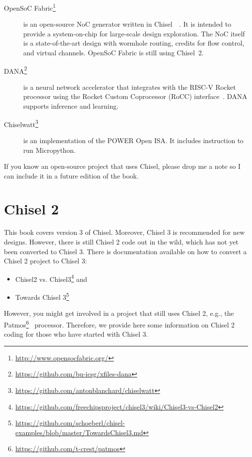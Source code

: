 \documentclass[%
    10pt,
    headinclude, footexclude,
    openright, %
    notitlepage,
    cleardoubleempty,
    headsepline,
    pointlessnumbers,
    bibtotoc, idxtotoc,
    ]{scrbook}
\newcommand{\myref}[2]{\href{#1}{#2}}
\renewcommand{\myref}[2]{{#2}{\footnote{\url{#1}}}}
\begin{document}
\begin{description}
\item[\myref{http://www.opensocfabric.org/}{OpenSoC Fabric}] is an open-source NoC
generator written in Chisel~~\cite{OpenSoC:ispass2016}. It is intended to provide a
system-on-chip for large-scale design exploration. The NoC itself is a state-of-the-art design with wormhole routing, credits for flow control, and virtual channels.
OpenSoC Fabric is still using Chisel~2.

\item[\myref{https://github.com/bu-icsg/xfiles-dana}{DANA}] is a neural network accelerator
that integrates with the RISC-V Rocket processor using the Rocket Custom Coprocessor (RoCC) interface~\cite{RoCC:2015}.
DANA supports inference and learning.

\item[\myref{https://github.com/antonblanchard/chiselwatt}{Chiselwatt}] is an implementation
of the POWER Open ISA. It includes instruction to run Micropython.

\end{description}

If you know an open-source project that uses Chisel, please drop me a note
so I can include it in a future edition of the book.

\chapter{Chisel 2}


This book covers version 3 of Chisel. Moreover, Chisel 3 is recommended for new designs.
However, there is still Chisel 2 code out in the wild, which has not yet been converted
to Chisel 3. There is documentation available on how to convert a Chisel 2 project to
Chisel 3:

\begin{itemize}
\item \myref{https://github.com/freechipsproject/chisel3/wiki/Chisel3-vs-Chisel2}{Chisel2 vs. Chisel3} and
\item \myref{https://github.com/schoeberl/chisel-examples/blob/master/TowardsChisel3.md}{Towards Chisel 3}
\end{itemize}

However, you might get involved in a project that still uses Chisel 2,
e.g., the \myref{https://github.com/t-crest/patmos}{Patmos}~\cite{patmos:rts2018} processor.
Therefore, we provide here some information on Chisel 2 coding for those who
have started with Chisel 3.
\end{document}
